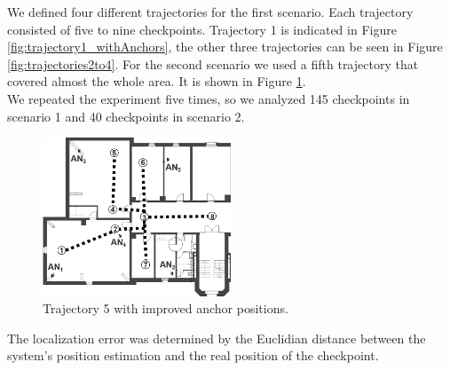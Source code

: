 \noindent\hspace*{5mm}%
We defined four different trajectories for the first scenario. Each trajectory consisted of five to nine checkpoints. Trajectory 1 is indicated in Figure \ref{fig:trajectory1_withAnchors}, the other three trajectories can be seen in Figure \ref{fig:trajectories2to4}.
For the second scenario we used a fifth trajectory that covered almost the whole area. It is shown in Figure \ref{fig:trajectory5_withAnchors}.\\
\noindent\hspace*{5mm}%
We repeated the experiment five times, so we analyzed 145 checkpoints in scenario 1 and 40 checkpoints in scenario 2.\begin{figure}[th]
\centering
\includegraphics[width=0.5\textwidth]{Figures/trajectory5_withAnchors}
\decoRule
\caption[Trajectory 5]{Trajectory 5 with improved anchor positions.}
\label{fig:trajectory5_withAnchors}
\end{figure}
The localization error was determined by the Euclidian distance between the system's position estimation and the real position of the checkpoint.\\
\noindent\hspace*{5mm}%
